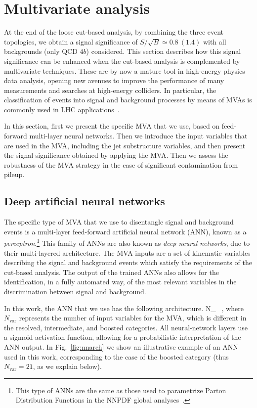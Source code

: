 \section{Multivariate analysis}
\label{sec:mva}

At the end of the loose cut-based analysis,
by combining the three event topologies,
we obtain a signal significance of $S/\sqrt{B}\simeq 0.8~(1.4)$
with all backgrounds (only QCD $4b$) considered.
%
This section describes how this signal significance
 can be enhanced when the cut-based analysis
 is complemented by multivariate techniques.
%
 These are by now a mature tool
 in high-energy physics data analysis, opening
 new avenues to improve the performance
of many measurements and searches at high-energy colliders.
%
In particular, the classification of events into
signal and
background processes by means of MVAs is
commonly used in LHC
applications~\cite{Baldi:2014pta,Aaltonen:2012qt,
  Wardrope:2014kya,Chatrchyan:2013zna,Dall'Osso:2015aia,Kang:2015uoc}.

In this section, first we present the specific MVA that we use,
based on feed-forward multi-layer neural networks.
%
Then we introduce the input variables that are
used in the MVA, including the jet substructure
variables, and then present the signal significance obtained
by applying the MVA.
%
Then we assess the robustness of the MVA strategy in
the case of significant contamination from pileup.

\subsection{Deep artificial neural networks}

The specific type of  MVA that we use to
disentangle signal and background events is
a multi-layer feed-forward artificial neural network (ANN),
known as a {\it perceptron}.\footnote{This type of ANNs are the same
  as those used to parametrize Parton Distribution Functions
in the NNPDF global analyses~\cite{DelDebbio:2004qj,Ball:2008by,Ball:2011mu,Ball:2010de}.}
%
This family of ANNs are also known as {\it deep neural networks},
due to their multi-layered architecture.
%
The MVA inputs are a set of kinematic variables describing the
signal and background
events which satisfy the requirements of the
cut-based analysis.
%
The output of the trained ANNs also allows for the identification,
in a fully automated way,
of the most relevant variables in the discrimination between 
signal and background.

In this work, the ANN that we use has the following architecture.
\be
\label{eq:nn1}
N_{} \, ,
\ee
where $N_{\mathrm{var}}$ represents the number of input variables for the MVA,
which is different in the resolved, intermediate, and boosted categories.
%
All neural-network layers use a sigmoid activation function, allowing
for a probabilistic
interpretation of the ANN output.
%
In Fig.~\ref{fig:nnarch} we show an illustrative
example of an ANN used in this work, corresponding 
to the case of the boosted category (thus $N_{\mathrm{var}}=21$, as we explain below).

